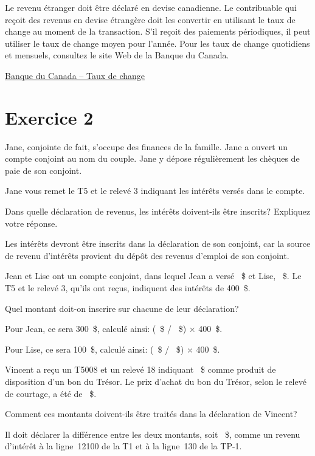 Le revenu étranger doit être déclaré en devise canadienne. Le contribuable qui reçoit des revenus en devise étrangère doit les convertir en utilisant le taux de change au moment de la transaction. S'il reçoit des paiements périodiques, il peut utiliser le taux de change moyen pour l'année. Pour les taux de change quotidiens et mensuels, consultez le site Web de la Banque du Canada.

\href{https://www.banqueducanada.ca/taux/taux-de-change/}{Banque du Canada -- Taux de change}



\section{Exercice 2}
\setcounter{question}{0}
\begin{question}
	Jane, conjointe de fait, s'occupe des finances de la famille. Jane a ouvert un compte conjoint au nom du couple. Jane y dépose régulièrement les chèques de paie de son conjoint.
	
	Jane vous remet le T5 et le relevé 3 indiquant les intérêts versés dans le compte.
	
	Dans quelle déclaration de revenus, les intérêts doivent-ils être inscrits? Expliquez votre réponse.
\end{question}
Les intérêts devront être inscrits dans la déclaration de son conjoint, car la source de revenu d'intérêts provient du dépôt des revenus d'emploi de son conjoint.

\begin{question}
	Jean et Lise ont un compte conjoint, dans lequel Jean a versé ~\$ et Lise, ~\$. Le T5 et le relevé 3, qu'ils ont reçus, indiquent des intérêts de 400~\$.
	
	Quel montant doit-on inscrire sur chacune de leur déclaration?
\end{question}
Pour Jean, ce sera 300~\$, calculé ainsi:  (~\$ / ~\$)  $\times$  400~\$.

Pour Lise, ce sera 100~\$, calculé ainsi:  (~\$ / ~\$)  $\times$  400~\$.

\begin{question}
	Vincent a reçu un T5008 et un relevé 18  indiquant ~\$ comme produit de disposition d'un bon du Trésor. Le prix d'achat du bon du Trésor, selon le relevé de courtage, a été de ~\$.
	
	Comment ces montants doivent-ils être traités dans la déclaration de Vincent? 
\end{question}
Il doit déclarer la différence entre les deux montants, soit ~\$, comme un revenu d'intérêt à la ligne~12100 de la T1 et à la ligne~130 de la TP-1.

